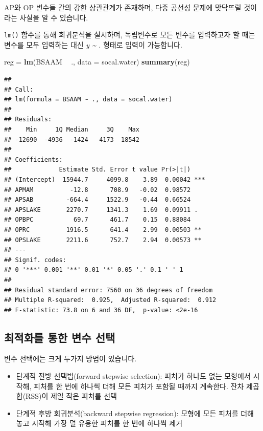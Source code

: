 \documentclass[12pt,]{book}
\newenvironment{Shaded}{\begin{snugshade}}{\end{snugshade}}
\newcommand{\DataTypeTok}[1]{\textcolor[rgb]{0.13,0.29,0.53}{#1}}
\newcommand{\KeywordTok}[1]{\textcolor[rgb]{0.13,0.29,0.53}{\textbf{#1}}}
\newcommand{\NormalTok}[1]{#1}
\newcommand{\OperatorTok}[1]{\textcolor[rgb]{0.81,0.36,0.00}{\textbf{#1}}}
\newcommand{\StringTok}[1]{\textcolor[rgb]{0.31,0.60,0.02}{#1}}
\begin{document}
AP와 OP 변수들 간의 강한 상관관계가 존재하며, 다중 공선성 문제에 맞닥뜨릴 것이라는 사실을 알 수 있습니다.

\texttt{lm()} 함수를 통해 회귀분석을 실시하며, 독립변수로 모든 변수를 입력하고자 할 때는 변수를 모두 입력하는 대신 \emph{y \textasciitilde{} .} 형태로 입력이 가능합니다.

\begin{Shaded}
\begin{Highlighting}[]
\NormalTok{reg =}\StringTok{ }\KeywordTok{lm}\NormalTok{(BSAAM }\OperatorTok{~}\StringTok{ }\NormalTok{., }\DataTypeTok{data =}\NormalTok{ socal.water)}
\KeywordTok{summary}\NormalTok{(reg)}
\end{Highlighting}
\end{Shaded}

\begin{verbatim}
## 
## Call:
## lm(formula = BSAAM ~ ., data = socal.water)
## 
## Residuals:
##    Min     1Q Median     3Q    Max 
## -12690  -4936  -1424   4173  18542 
## 
## Coefficients:
##             Estimate Std. Error t value Pr(>|t|)    
## (Intercept)  15944.7     4099.8    3.89  0.00042 ***
## APMAM          -12.8      708.9   -0.02  0.98572    
## APSAB         -664.4     1522.9   -0.44  0.66524    
## APSLAKE       2270.7     1341.3    1.69  0.09911 .  
## OPBPC           69.7      461.7    0.15  0.88084    
## OPRC          1916.5      641.4    2.99  0.00503 ** 
## OPSLAKE       2211.6      752.7    2.94  0.00573 ** 
## ---
## Signif. codes:  
## 0 '***' 0.001 '**' 0.01 '*' 0.05 '.' 0.1 ' ' 1
## 
## Residual standard error: 7560 on 36 degrees of freedom
## Multiple R-squared:  0.925,  Adjusted R-squared:  0.912 
## F-statistic: 73.8 on 6 and 36 DF,  p-value: <2e-16
\end{verbatim}

\hypertarget{uxcd5cuxc801uxd654uxb97c-uxd1b5uxd55c-uxbcc0uxc218-uxc120uxd0dd}{%
\subsection{최적화를 통한 변수 선택}\label{uxcd5cuxc801uxd654uxb97c-uxd1b5uxd55c-uxbcc0uxc218-uxc120uxd0dd}}

변수 선택에는 크게 두가지 방법이 있습니다.

\begin{itemize}
\item
  단계적 전방 선택법(forward stepwise selection): 피처가 하나도 없는 모형에서 시작해, 피처를 한 번에 하나씩 더해 모든 피처가 포함될 때까지 계속한다. 잔차 제곱합(RSS)이 제일 작은 피처를 선택
\item
  단계적 후방 회귀분석(backward stepwise regression): 모형에 모든 피처를 더해 놓고 시작해 가장 덜 유용한 피처를 한 번에 하나씩 제거
\end{itemize}
\end{document}
